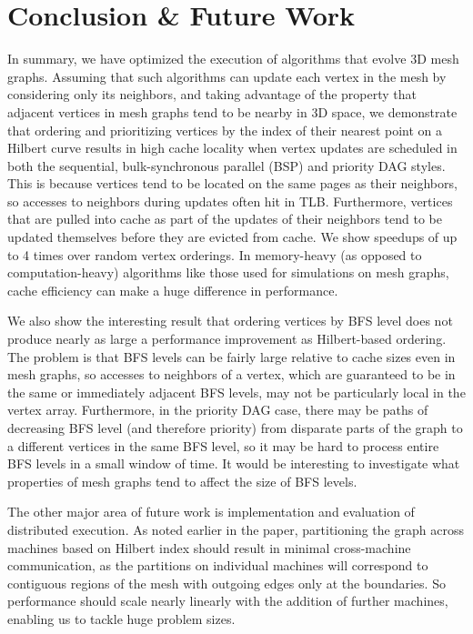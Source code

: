 \documentclass[journal]{IEEEtran}
\begin{document}
\section{Conclusion \& Future Work}
In summary, we have optimized the execution of algorithms that evolve 3D mesh graphs. Assuming that such algorithms can update each vertex in the mesh by considering only its neighbors, and taking advantage of the property that adjacent vertices in mesh graphs tend to be nearby in 3D space, we demonstrate that ordering and prioritizing vertices by the index of their nearest point on a Hilbert curve results in high cache locality when vertex updates are scheduled in both the sequential, bulk-synchronous parallel (BSP) and priority DAG styles. This is because vertices tend to be located on the same pages as their neighbors, so accesses to neighbors during updates often hit in TLB. Furthermore, vertices that are pulled into cache as part of the updates of their neighbors tend to be updated themselves before they are evicted from cache. We show speedups of up to 4 times over random vertex orderings. In memory-heavy (as opposed to computation-heavy) algorithms like those used for simulations on mesh graphs, cache efficiency can make a huge difference in performance.

We also show the interesting result that ordering vertices by BFS level does not produce nearly as large a performance improvement as Hilbert-based ordering. The problem is that BFS levels can be fairly large relative to cache sizes even in mesh graphs, so accesses to neighbors of a vertex, which are guaranteed to be in the same or immediately adjacent BFS levels, may not be particularly local in the vertex array. Furthermore, in the priority DAG case, there may be paths of decreasing BFS level (and therefore priority) from disparate parts of the graph to a different vertices in the same BFS level, so it may be hard to process entire BFS levels in a small window of time. It would be interesting to investigate what properties of mesh graphs tend to affect the size of BFS levels.

The other major area of future work is implementation and evaluation of distributed execution. As noted earlier in the paper, partitioning the graph across machines based on Hilbert index should result in minimal cross-machine communication, as the partitions on individual machines will correspond to contiguous regions of the mesh with outgoing edges only at the boundaries. So performance should scale nearly linearly with the addition of further machines, enabling us to tackle huge problem sizes.  
\ifCLASSOPTIONcaptionsoff
  \newpage
\fi
\end{document}
